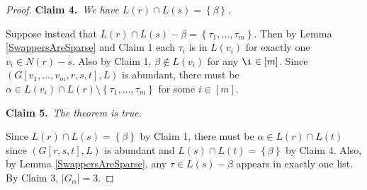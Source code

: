\documentclass[12pt]{article}
\theoremstyle{plain}
\theoremstyle{definition}
\theoremstyle{remark}
\newcommand{\set}[1]{\left\{ #1 \right\}}
\newcommand{\irange}[1]{\left[#1\right]}
\newcommand{\claim}[2]{{\bf Claim #1.}~{\it #2}~~}
\begin{document}
\begin{proof}
		\claim{4}{We have $L(r) \cap L(s) = \set{\beta}$.}
		
			Suppose instead that $L(r) \cap L(s) - \beta = \set{\tau_1, \ldots, \tau_m}$.  Then by Lemma \ref{SwappersAreSparse} and Claim 1 each $\tau_i$ is in $L(v_i)$ for exactly one $v_i \in N(r) - s$.  Also by Claim 1, $\beta \not \in L(v_i)$ for any $\i \in \irange{m}$.  Since $(G[v_1, \ldots, v_m,r,s,t], L)$ is abundant, there must be $\alpha \in L(v_i) \cap L(r) \setminus \set{\tau_1, \ldots, \tau_m}$ for some $i \in \irange{m}$.
			
		
			
		\claim{5}{The theorem is true.}
		
			 Since $L(r) \cap L(s) = \set{\beta}$ by Claim 1, there must be $\alpha \in L(r) \cap L(t)$ since $(G[r,s,t],L)$ is abundant and $L(s) \cap L(t) = \set{\beta}$ by Claim 4.  Also, by Lemma \ref{SwappersAreSparse}, any $\tau \in L(s) - \beta$ appears in exactly one list.  By Claim 3, $|G_\alpha| = 3$.

	\end{proof}



\end{document}
